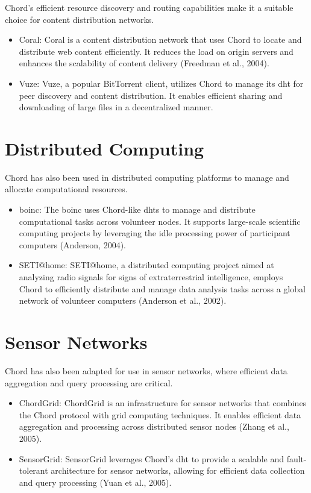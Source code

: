 Chord's efficient resource discovery and routing capabilities make it a suitable choice for content distribution networks.
\begin{itemize}
    \item Coral: Coral is a content distribution network that uses Chord to locate and distribute web content efficiently.
    It reduces the load on origin servers and enhances the scalability of content delivery (Freedman et al., 2004).
    \item Vuze: Vuze, a popular BitTorrent client, utilizes Chord to manage its \gls{dht} for peer discovery and content distribution.
    It enables efficient sharing and downloading of large files in a decentralized manner.
\end{itemize}

\section{Distributed Computing}
Chord has also been used in distributed computing platforms to manage and allocate computational resources.
\begin{itemize}
    \item \acrshort{boinc}: The \gls{boinc} uses Chord-like \glspl{dht} to manage and distribute computational tasks across volunteer nodes.
    It supports large-scale scientific computing projects by leveraging the idle processing power of participant computers (Anderson, 2004).
    \item SETI@home: SETI@home, a distributed computing project aimed at analyzing radio signals for signs of extraterrestrial intelligence, employs Chord to efficiently distribute and manage data analysis tasks across a global network of volunteer computers (Anderson et al., 2002).
\end{itemize}

\section{Sensor Networks}
Chord has also been adapted for use in sensor networks, where efficient data aggregation and query processing are critical.
\begin{itemize}
    \item ChordGrid: ChordGrid is an infrastructure for sensor networks that combines the Chord protocol with grid computing techniques.
    It enables efficient data aggregation and processing across distributed sensor nodes (Zhang et al., 2005).
    \item SensorGrid: SensorGrid leverages Chord's \gls{dht} to provide a scalable and fault-tolerant architecture for sensor networks, allowing for efficient data collection and query processing (Yuan et al., 2005).
\end{itemize}